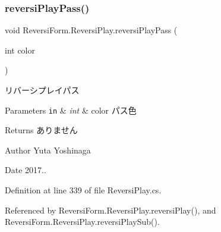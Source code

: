 \subsubsection{\texorpdfstring{reversi\+Play\+Pass()}{reversiPlayPass()}}
{\footnotesize\ttfamily void Reversi\+Form.\+Reversi\+Play.\+reversi\+Play\+Pass (\begin{DoxyParamCaption}\item[{int}]{color }\end{DoxyParamCaption})}



リバーシプレイパス 


\begin{DoxyParams}[1]{Parameters}
\mbox{\tt in}  & {\em int} & color パス色 \\
\hline
\end{DoxyParams}
\begin{DoxyReturn}{Returns}
ありません 
\end{DoxyReturn}
\begin{DoxyAuthor}{Author}
Yuta Yoshinaga 
\end{DoxyAuthor}
\begin{DoxyDate}{Date}
2017.. 
\end{DoxyDate}


Definition at line 339 of file Reversi\+Play.\+cs.



Referenced by Reversi\+Form.\+Reversi\+Play.\+reversi\+Play(), and Reversi\+Form.\+Reversi\+Play.\+reversi\+Play\+Sub().

